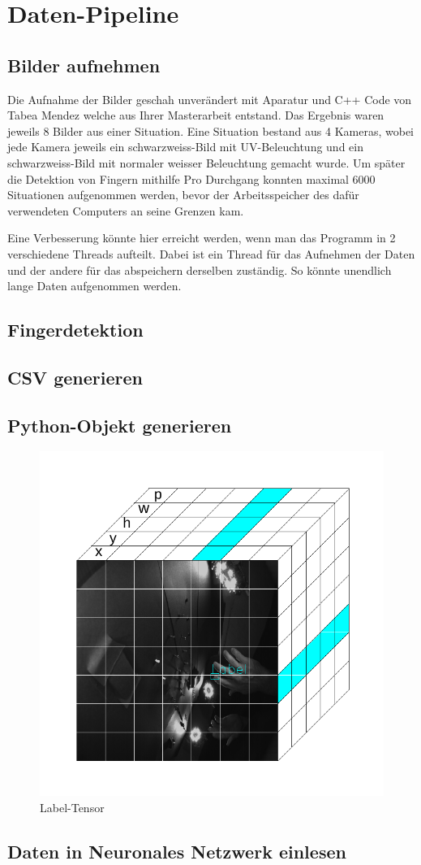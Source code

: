 \newpage
\section{Daten-Pipeline}
\subsection{Bilder aufnehmen}
Die Aufnahme der Bilder geschah unverändert mit Aparatur und C++ Code von Tabea Mendez welche aus Ihrer Masterarbeit entstand. 
Das Ergebnis waren jeweils 8 Bilder aus einer Situation. 
Eine Situation bestand aus 4 Kameras, wobei jede Kamera jeweils ein schwarzweiss-Bild mit UV-Beleuchtung und ein schwarzweiss-Bild mit normaler weisser Beleuchtung gemacht wurde.
Um später die Detektion von Fingern mithilfe  
Pro Durchgang konnten maximal 6000 Situationen aufgenommen werden, bevor der Arbeitsspeicher des dafür verwendeten Computers an seine Grenzen kam. 

Eine Verbesserung könnte hier erreicht werden, wenn man das Programm in 2 verschiedene Threads aufteilt.
Dabei ist ein Thread für das Aufnehmen der Daten und der andere für das abspeichern derselben zuständig.
So könnte \grqq{}unendlich lange\grqq{} Daten aufgenommen werden.
\subsection{Fingerdetektion}
\subsection{CSV generieren}
\subsection{Python-Objekt generieren}
\begin{figure}	
	\centering
	\includegraphics[width=.8\textwidth]{Kapitel/DatenPipeline/Bilder/LabelTensor.pdf}
	\caption{Label-Tensor}
	\label{img:label_tensor}
\end{figure} 
\subsection{Daten in Neuronales Netzwerk einlesen}

